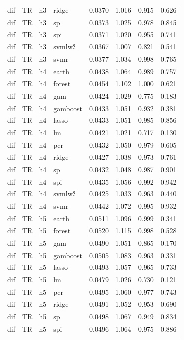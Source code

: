 \begin{ThreePartTable}
\begin{longtable}[t]{llclcccc}
dif & TR & h3 & ridge & 0.0370 & 1.016 & 0.915 & 0.626\\
dif & TR & h3 & sp & 0.0373 & 1.025 & 0.978 & 0.845\\
dif & TR & h3 & spi & 0.0371 & 1.020 & 0.955 & 0.741\\
dif & TR & h3 & svmlw2 & 0.0367 & 1.007 & 0.821 & 0.541\\
dif & TR & h3 & svmr & 0.0377 & 1.034 & 0.998 & 0.765\\
\addlinespace
dif & TR & h4 & earth & 0.0438 & 1.064 & 0.989 & 0.757\\
dif & TR & h4 & forest & 0.0454 & 1.102 & 1.000 & 0.621\\
dif & TR & h4 & gam & 0.0424 & 1.029 & 0.775 & 0.183\\
dif & TR & h4 & gamboost & 0.0433 & 1.051 & 0.932 & 0.381\\
dif & TR & h4 & lasso & 0.0433 & 1.051 & 0.985 & 0.856\\
dif & TR & h4 & lm & 0.0421 & 1.021 & 0.717 & 0.130\\
dif & TR & h4 & pcr & 0.0432 & 1.050 & 0.979 & 0.605\\
dif & TR & h4 & ridge & 0.0427 & 1.038 & 0.973 & 0.761\\
dif & TR & h4 & sp & 0.0432 & 1.048 & 0.987 & 0.901\\
dif & TR & h4 & spi & 0.0435 & 1.056 & 0.992 & 0.942\\
dif & TR & h4 & svmlw2 & 0.0425 & 1.033 & 0.963 & 0.440\\
dif & TR & h4 & svmr & 0.0442 & 1.072 & 0.995 & 0.932\\
\addlinespace
dif & TR & h5 & earth & 0.0511 & 1.096 & 0.999 & 0.341\\
dif & TR & h5 & forest & 0.0520 & 1.115 & 0.998 & 0.528\\
dif & TR & h5 & gam & 0.0490 & 1.051 & 0.865 & 0.170\\
dif & TR & h5 & gamboost & 0.0505 & 1.083 & 0.963 & 0.331\\
dif & TR & h5 & lasso & 0.0493 & 1.057 & 0.965 & 0.733\\
dif & TR & h5 & lm & 0.0479 & 1.026 & 0.730 & 0.121\\
dif & TR & h5 & pcr & 0.0495 & 1.060 & 0.977 & 0.743\\
dif & TR & h5 & ridge & 0.0491 & 1.052 & 0.953 & 0.690\\
dif & TR & h5 & sp & 0.0498 & 1.067 & 0.949 & 0.834\\
dif & TR & h5 & spi & 0.0496 & 1.064 & 0.975 & 0.886\\

\end{longtable}
\end{ThreePartTable}
